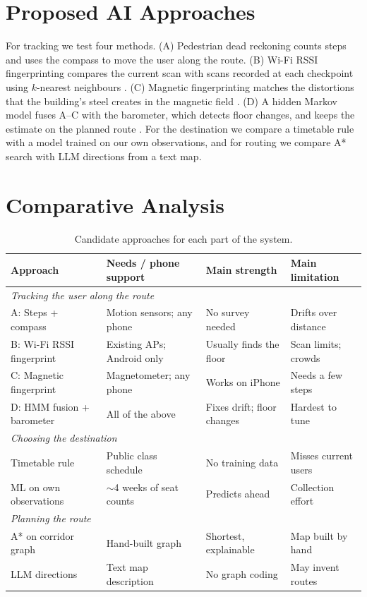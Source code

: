 \documentclass{article}
\begin{document}
\section{Proposed AI Approaches}
For tracking we test four methods. (A) Pedestrian dead reckoning counts steps and uses the compass to move the user along the route. (B) Wi-Fi RSSI fingerprinting compares the current scan with scans recorded at each checkpoint using $k$-nearest neighbours \cite{bahl2000}. (C) Magnetic fingerprinting matches the distortions that the building's steel creates in the magnetic field \cite{haverinen2009}. (D) A hidden Markov model fuses A--C with the barometer, which detects floor changes, and keeps the estimate on the planned route \cite{rabiner1989}. For the destination we compare a timetable rule with a model trained on our own observations, and for routing we compare A* search \cite{hart1968} with LLM directions from a text map.

\section{Comparative Analysis}
\begin{table}[h]
  \centering
  \caption{Candidate approaches for each part of the system.}
  \label{tab:approach-comparison}
  \footnotesize
  \setlength{\tabcolsep}{3.5pt}
  \begin{tabular}{llll}
    \toprule
    Approach & Needs / phone support & Main strength & Main limitation \\
    \midrule
    \multicolumn{4}{l}{\textit{Tracking the user along the route}} \\
    A: Steps + compass & Motion sensors; any phone & No survey needed & Drifts over distance \\
    B: Wi-Fi RSSI fingerprint & Existing APs; Android only & Usually finds the floor & Scan limits; crowds \\
    C: Magnetic fingerprint & Magnetometer; any phone & Works on iPhone & Needs a few steps \\
    D: HMM fusion + barometer & All of the above & Fixes drift; floor changes & Hardest to tune \\
    \midrule
    \multicolumn{4}{l}{\textit{Choosing the destination}} \\
    Timetable rule & Public class schedule & No training data & Misses current users \\
    ML on own observations & $\sim$4 weeks of seat counts & Predicts ahead & Collection effort \\
    \midrule
    \multicolumn{4}{l}{\textit{Planning the route}} \\
    A* on corridor graph & Hand-built graph & Shortest, explainable & Map built by hand \\
    LLM directions & Text map description & No graph coding & May invent routes \\
    \bottomrule
  \end{tabular}
\end{table}
\end{document}
